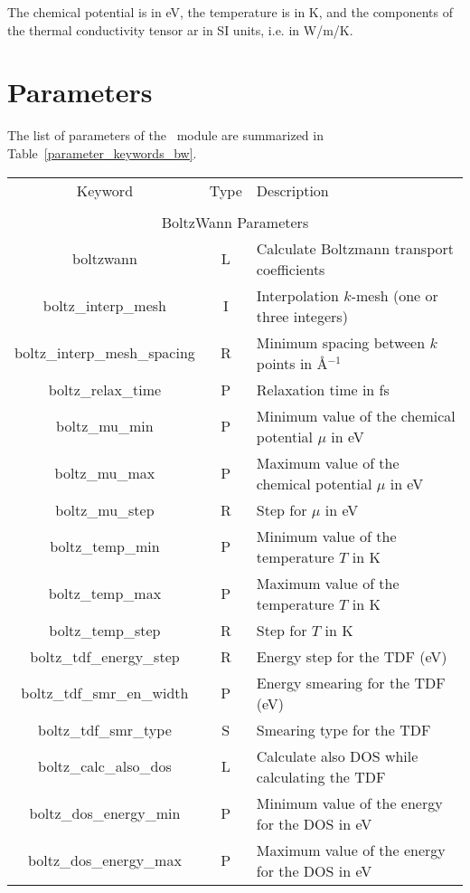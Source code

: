 The chemical potential is in eV, the temperature is in K, and the components of the thermal conductivity tensor ar in SI units, i.e. in W/m/K.
\section{Parameters}
The list of parameters of the \bw\ module are summarized in Table~\ref{parameter_keywords_bw}. 

\begin{table}
\begin{center}
\begin{tabular}{|c|c|p{6cm}|}
\hline
Keyword & Type & Description \\
        &      &             \\
\hline\hline
\multicolumn{3}{|c|}{BoltzWann Parameters} \\
\hline
{\sc boltzwann}   & L & Calculate Boltzmann transport coefficients \\
{\sc boltz\_interp\_mesh} & I & Interpolation $k$-mesh (one or three integers)\\ 
{\sc boltz\_interp\_mesh\_spacing} & R & Minimum spacing between $k$ points in \AA$^{-1}$\\
{\sc boltz\_relax\_time} & P & Relaxation time in fs\\
{\sc boltz\_mu\_min} & P & Minimum value of the chemical potential $\mu$ in eV\\
{\sc boltz\_mu\_max} & P & Maximum value of the chemical potential $\mu$ in eV\\
{\sc boltz\_mu\_step} & R & Step for $\mu$ in eV\\
{\sc boltz\_temp\_min} & P & Minimum value of the temperature $T$ in K \\
{\sc boltz\_temp\_max} & P & Maximum value of the temperature $T$ in K \\
{\sc boltz\_temp\_step} & R & Step for $T$ in K \\
{\sc boltz\_tdf\_energy\_step} & R & Energy step for the TDF (eV) \\
{\sc boltz\_tdf\_smr\_en\_width} & P & Energy smearing for the TDF (eV) \\
{\sc boltz\_tdf\_smr\_type} & S & Smearing type for the TDF \\
{\sc boltz\_calc\_also\_dos} & L & Calculate also DOS while calculating the TDF\\
{\sc boltz\_dos\_energy\_min} & P & Minimum value of the energy for the DOS in eV \\
{\sc boltz\_dos\_energy\_max} & P & Maximum value of the energy for the DOS in eV \\

\end{tabular}
\end{center}
\end{table}
